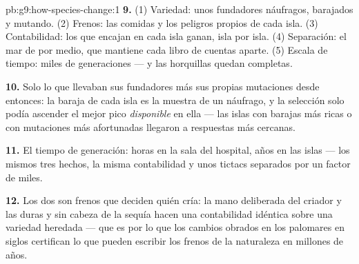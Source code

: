 \begin{solution}{pb:g9:how-species-change:1}
\textbf{9.} (1) Variedad: unos fundadores náufragos, barajados y
mutando. (2) Frenos: las comidas y los peligros propios de cada isla.
(3) Contabilidad: los  que encajan en cada isla ganan, isla por
isla. (4) Separación: el mar de por medio, que mantiene cada libro de
cuentas aparte. (5) Escala de tiempo: miles de generaciones --- y las
horquillas quedan completas.

\textbf{10.} Solo lo que llevaban sus fundadores más sus propias
mutaciones desde entonces: la baraja de cada isla es la muestra de un
náufrago, y la selección solo podía ascender el mejor pico
\emph{disponible} en ella --- las islas con barajas más ricas o con
mutaciones más afortunadas llegaron a respuestas más cercanas.

\textbf{11.} El tiempo de generación: horas en la sala del hospital,
años en las islas --- los mismos tres hechos, la misma contabilidad y
unos tictacs separados por un factor de miles.

\textbf{12.} Los dos son frenos que deciden quién cría: la mano
deliberada del criador y las  duras y sin cabeza de la sequía
hacen una contabilidad idéntica sobre una variedad heredada --- que es
por lo que los cambios obrados en los palomares en siglos certifican lo
que pueden escribir los frenos de la naturaleza en millones de años.
\end{solution}
